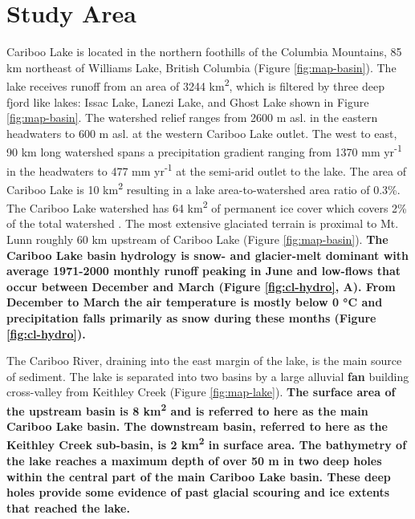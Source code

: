 \documentclass[Royal,times,doublespace,sageh]{sagej}
\begin{document}
\hypertarget{study-area}{%
\section{Study Area}\label{study-area}}

Cariboo Lake is located in the northern foothills of the Columbia
Mountains, 85 km northeast of Williams Lake, British Columbia (Figure
\ref{fig:map-basin}). The lake receives runoff from an area of 3244
km\textsuperscript{2}, which is filtered by three deep fjord like lakes:
Issac Lake, Lanezi Lake, and Ghost Lake shown in Figure
\ref{fig:map-basin}. The watershed relief ranges from 2600 m asl. in the
eastern headwaters to 600 m asl. at the western Cariboo Lake outlet. The
west to east, 90 km long watershed spans a precipitation gradient
ranging from 1370 mm yr\textsuperscript{-1} in the headwaters to 477 mm
yr\textsuperscript{-1} at the semi-arid outlet to the lake. The area of
Cariboo Lake is 10 km\textsuperscript{2} resulting in a lake
area-to-watershed area ratio of 0.3\%. The Cariboo Lake watershed has 64
km\textsuperscript{2} of permanent ice cover which covers 2\% of the
total watershed \citep{Bolch2008}. The most extensive glaciated terrain
is proximal to Mt. Lunn roughly 60 km upstream of Cariboo Lake (Figure
\ref{fig:map-basin}). \textbf{The Cariboo Lake basin hydrology is snow-
and glacier-melt dominant with average 1971-2000 monthly runoff peaking
in June and low-flows that occur between December and March (Figure
\ref{fig:cl-hydro}, A). From December to March the air temperature is
mostly below 0 °C and precipitation falls primarily as snow during these
months (Figure \ref{fig:cl-hydro}).}

The Cariboo River, draining into the east margin of the lake, is the
main source of sediment. The lake is separated into two basins by a
large alluvial \textbf{fan} building cross-valley from Keithley Creek
(Figure \ref{fig:map-lake}). \textbf{The surface area of the upstream
basin is 8 km\textsuperscript{2} and is referred to here as the main
Cariboo Lake basin. The downstream basin, referred to here as the
Keithley Creek sub-basin, is 2 km\textsuperscript{2} in surface area.
The bathymetry of the lake reaches a maximum depth of over 50 m in two
deep holes within the central part of the main Cariboo Lake basin. These
deep holes provide some evidence of past glacial scouring and ice
extents that reached the lake.}
\end{document}

